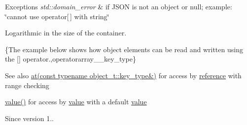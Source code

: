 \begin{DoxyExceptions}{Exceptions}
{\em std\+::domain\+\_\+error} & if J\+S\+ON is not an object or null; example\+: {\ttfamily \char`\"{}cannot use operator\mbox{[}$\,$\mbox{]} with string\char`\"{}}\\
\hline
\end{DoxyExceptions}
Logarithmic in the size of the container.

\{The example below shows how object elements can be read and written using the {\ttfamily \mbox{[}\mbox{]}} operator.,operatorarray\+\_\+\+\_\+key\+\_\+type\}

\begin{DoxySeeAlso}{See also}
\hyperlink{classnlohmann_1_1basic__json_a7ed92d56cb313b243c1917696ffdf074}{at(const typename object\+\_\+t\+::key\+\_\+type\&)} for access by \hyperlink{classnlohmann_1_1basic__json_a3ec8e17be8732fe436e9d6733f52b7a3}{reference} with range checking 

\hyperlink{classnlohmann_1_1basic__json_a407e73a037e6e3067ef7aa2c25a79f39}{value()} for access by \hyperlink{classnlohmann_1_1basic__json_a407e73a037e6e3067ef7aa2c25a79f39}{value} with a default \hyperlink{classnlohmann_1_1basic__json_a407e73a037e6e3067ef7aa2c25a79f39}{value}
\end{DoxySeeAlso}
\begin{DoxySince}{Since}
version 1.. 
\end{DoxySince}
\hypertarget{classnlohmann_1_1basic__json_ad797fbde8b35ce96549d4bee5d42b234}{}\label{classnlohmann_1_1basic__json_ad797fbde8b35ce96549d4bee5d42b234} 
